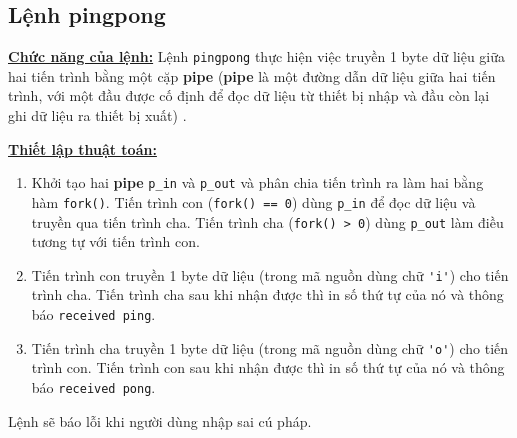 \subsection{Lệnh pingpong}
\underline{\textbf{Chức năng của lệnh:}} Lệnh \verb|pingpong| thực hiện việc truyền 1 byte dữ liệu giữa hai tiến trình bằng một cặp \textbf{pipe} (\textbf{pipe} là một đường dẫn dữ liệu giữa hai tiến trình, với một đầu được cố định để đọc dữ liệu từ thiết bị nhập và đầu còn lại ghi dữ liệu ra \linebreak thiết bị xuất) \cite{mit-xv6}.

\underline{\textbf{Thiết lập thuật toán:}}
\begin{enumerate}[labelindent=1em, labelsep=0.2cm, leftmargin=1cm, wide=\parindent, topsep=0.1cm, itemsep=-1ex, partopsep=1.5ex, parsep=1.5ex]
	\item Khởi tạo hai \textbf{pipe} \verb|p_in| và \verb|p_out| và phân chia tiến trình ra làm hai bằng hàm \verb|fork()|. Tiến trình con (\verb|fork() == 0|) dùng \verb|p_in| để đọc dữ liệu và truyền qua tiến trình cha. Tiến trình cha (\verb|fork() > 0|) dùng \verb|p_out| làm điều tương tự với tiến trình con.
	\item Tiến trình con truyền 1 byte dữ liệu (trong mã nguồn dùng chữ \verb|'i'|) cho tiến trình cha. Tiến trình cha sau khi nhận được thì in số thứ tự của nó và thông báo \verb|received ping|.
	\item Tiến trình cha truyền 1 byte dữ liệu (trong mã nguồn dùng chữ \verb|'o'|) cho tiến trình con. Tiến trình con sau khi nhận được thì in số thứ tự của nó và thông báo \verb|received pong|.
\end{enumerate}

Lệnh sẽ báo lỗi khi người dùng nhập sai cú pháp.

